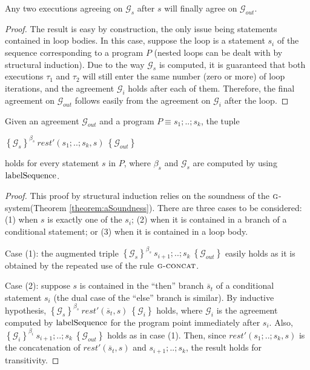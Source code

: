 \documentclass[prodmode,acmtocl]{acmsmall}
\def\prog{\ensuremath{P}\xspace}
\def\trace{\ensuremath{\tau}\xspace}
\newcommand{\0}{\mbox{\bf 0}}
\newcommand{\CODE}[1]{\ensuremath{\mbox{\lstinline!#1!}\xspace}\xspace}
\def\PRED{\beta}
\def\AGREEM{\mathcal{G}}
\newcommand{\RULENAME}[1]{\textsc{#1}}
\newcommand{\GRULENAME}[1]{\textsc{g-#1}}
\newcommand{\GSMTH}[1]{$\RULENAME{g}$-#1}
\def\GSYSTEM{\GSMTH{system}\xspace}
\newcommand{\TRIPLEB}[4]{\left\{#1\right\}^{#2}\ #3\ \left\{#4\right\}}
\begin{document}
{  \begin{proposition}
    \label{prop:erasureSoundness}
    Any two executions agreeing on $\AGREEM_s$ after $s$ will finally
    agree on $\AGREEM_{out}$.
  \end{proposition}
  
  \begin{proof}
    The result is easy by construction, the only issue being statements
    contained in loop bodies.  In this case, suppose the loop is a
    statement $s_i$ of the sequence corresponding to a program $\prog$
    (nested loops can be dealt with by structural induction).  Due to
    the way $\AGREEM_s$ is computed, it is guaranteed that both
    executions $\trace_1$ and $\trace_2$ will still enter the same
    number (zero or more) of loop iterations, and the agreement
    $\AGREEM_i$ holds after each of them.  Therefore, the final
    agreement on $\AGREEM_{out}$ follows easily from the agreement on
    $\AGREEM_i$ after the loop.
  \end{proof}
  
  \begin{proposition}
    \label{prop:erasureSoundness1}
    Given an agreement $\AGREEM_{out}$ and a program $\prog \equiv
    s_1;..;s_k$, the tuple
    
    \centerline{$\TRIPLEB{\AGREEM_s}{\PRED_s}{\mathit{rest}'(s_1;..;s_k,s)}{\AGREEM_{out}}$}
    \noindent holds for every statement $s$ in $\prog$, where $\PRED_s$
    and $\AGREEM_s$ are computed by using \CODE{labelSequence}.
  \end{proposition}
  
  \begin{proof}
    This proof by structural induction relies on the soundness of the
    \GSYSTEM (Theorem \ref{theorem:aSoundness}).  There are three cases
    to be considered: (1) when $s$ is exactly one of the $s_i$; (2) when
    it is contained in a branch of a conditional statement; or (3) when
    it is contained in a loop body.
    
    Case (1): the augmented triple
    $\TRIPLEB{\AGREEM_s}{\PRED_s}{s_{i+1};..;s_k}{\AGREEM_{out}}$ easily
    holds as it is obtained by the repeated use of the rule
    $\GRULENAME{concat}$.
    
    Case (2): suppose $s$ is contained in the ``then'' branch
    $\overline{s}_t$ of a conditional statement $s_i$ (the dual case of
    the ``else'' branch is similar).  By inductive hypothesis,
    $\TRIPLEB{\AGREEM_s}{\PRED_s}{\mathit{rest}'(\overline{s}_t,s)}{\AGREEM_i}$
    holds, where $\AGREEM_i$ is the agreement computed by
    \CODE{labelSequence} for the program point immediately after $s_i$.
    Also, $\TRIPLEB{\AGREEM_i}{\PRED_i}{s_{i+1};..;s_k}{\AGREEM_{out}}$
    holds as in case (1).  Then, since $\mathit{rest}'(s_1;..;s_k,s)$ is
    the concatenation of $\mathit{rest}'(\overline{s}_t,s)$ and
    $s_{i+1};..;s_k$, the result holds for transitivity.
    

\end{proof}}
\end{document}
